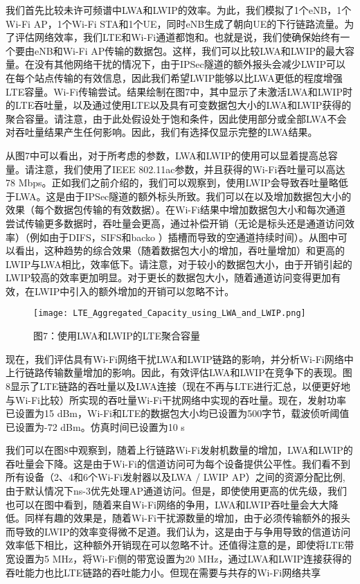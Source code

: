我们首先比较未许可频谱中LWA和LWIP的效率。为此，我们模拟了1个eNB，1个Wi-Fi AP，1个Wi-Fi STA和1个UE，同时eNB生成了朝向UE的下行链路流量。为了评估网络效率，我们LTE和Wi-Fi通道都饱和。也就是说，我们使确保始终有一个要由eNB和Wi-Fi AP传输的数据包。这样，我们可以比较LWA和LWIP的最大容量。在没有其他网络干扰的情况下，由于IPSec隧道的额外报头会减少LWIP可以在每个站点传输的有效信息，因此我们希望LWIP能够以比LWA更低的程度增强LTE容量。Wi-Fi传输尝试。结果绘制在图7中，其中显示了未激活LWA和LWIP时的LTE吞吐量，以及通过使用LTE以及具有可变数据包大小的LWA和LWIP获得的聚合容量。请注意，由于此处假设处于饱和条件，因此使用部分或全部LWA不会对吞吐量结果产生任何影响。因此，我们有选择仅显示完整的LWA结果。

从图7中可以看出，对于所考虑的参数，LWA和LWIP的使用可以显着提高总容量。请注意，我们使用了IEEE 802.11ac参数，并且获得的Wi-Fi吞吐量可以高达78 Mbps。正如我们之前介绍的，我们可以观察到，使用LWIP会导致吞吐量略低于LWA。这是由于IPSec隧道的额外标头所致。我们可以在以及增加数据包大小的效果（每个数据包传输的有效数据）。在Wi-Fi结果中增加数据包大小和每次通道尝试传输更多数据时，吞吐量会更高，通过补偿开销（无论是标头还是通道访问效率）（例如由于DIFS，SIFS和backo ）插槽而导致的空通道持续时间）。从图中可以看出，这种趋势的综合效果（随着数据包大小的增加，吞吐量增加）和更高的LWIP与LWA相比，效率低下。请注意，对于较小的数据包大小，由于开销引起的LWIP较高的效率更加明显。对于更长的数据包大小，随着通道访问变得更加有效，在LWIP中引入的额外增加的开销可以忽略不计。

\begin{figure}[htb]
  \centering
  \texttt{[image: LTE\_Aggregated\_Capacity\_using\_LWA\_and\_LWIP.png]}
  \caption*{图7：使用LWA和LWIP的LTE聚合容量}
\end{figure}

现在，我们评估具有Wi-Fi网络干扰LWA和LWIP链路的影响，并分析Wi-Fi网络中上行链路传输数量增加的影响。因此，有效评估LWA和LWIP在竞争下的表现。图8显示了LTE链路的吞吐量以及LWA连接（现在不再与LTE进行汇总，以便更好地与Wi-Fi比较）所实现的吞吐量Wi-Fi干扰网络中实现的吞吐量。现在，发射功率已设置为15 dBm，Wi-Fi和LTE的数据包大小均已设置为500字节，载波侦听阈值已设置为-72 dBm。仿真时间已设置为10 s

我们可以在图8中观察到，随着上行链路Wi-Fi发射机数量的增加，LWA和LWIP的吞吐量会下降。这是由于Wi-Fi的信道访问可为每个设备提供公平性。我们看不到所有设备（2、4和6个Wi-Fi发射器以及LWA / LWIP AP）之间的资源分配比例,由于默认情况下ns-3优先处理AP通道访问。但是，即使使用更高的优先级，我们也可以在图中看到，随着来自Wi-Fi网络的争用，LWA和LWIP吞吐量会大大降低。同样有趣的效果是，随着Wi-Fi干扰源数量的增加，由于必须传输额外的报头而导致的LWIP的效率变得微不足道。我们认为，这是由于与争用导致的信道访问效率低下相比，这种额外开销现在可以忽略不计。还值得注意的是，即使将LTE带宽设置为5 MHz，将Wi-Fi侧的带宽设置为20 MHz，通过LWA和LWIP连接获得的吞吐能力也比LTE链路的吞吐能力小。但现在需要与共存的Wi-Fi网络共享

